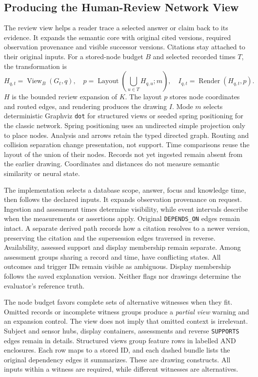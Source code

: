 \subsection{Producing the Human-Review Network View}
\label{sec:reviewview}

The review view helps a reader trace a selected answer or claim back to its
evidence. It expands the semantic core with original cited versions, required
observation provenance and visible successor versions. Citations stay attached
to their original inputs. For a stored-node budget $B$ and selected recorded
times $T$, the transformation is
\begin{equation}
 H_{q,t}=\operatorname{View}_B(G_t,q),\quad
 p=\operatorname{Layout}\!\left(\bigcup_{u\in T}H_{q,u};m\right),\quad
 I_{q,t}=\operatorname{Render}(H_{q,t},p).
\label{eq:reviewview}
\end{equation}
$H$ is the bounded review expansion of $K$. The layout $p$ stores node coordinates
and routed edges, and rendering produces the drawing $I$.
Mode $m$ selects deterministic Graphviz \texttt{dot} for structured views or
seeded spring positioning for the classic network. Spring positioning uses an
undirected simple projection only to place nodes. Analysis and arrows retain
the typed directed graph. Routing and collision separation change presentation,
not support. Time comparisons reuse the layout of the union of their nodes.
Records not yet ingested remain absent from the earlier drawing. Coordinates
and distances do not measure semantic similarity or neural state.

The implementation selects a database scope, answer, focus and knowledge time,
then follows the declared inputs. It expands observation provenance on request.
Ingestion and assessment times determine visibility, while event intervals
describe when the measurements or assertions apply.
Original \texttt{DEPENDS\_ON} edges remain intact. A separate derived path records
how a citation resolves to a newer version, preserving the citation and the
supersession edges traversed in reverse. Availability, assessed support and
display membership remain separate. Among \SemAssessmentTies{} assessment groups
sharing a record and time, \SemAssessmentConflicts{} have conflicting states.
All outcomes and trigger IDs remain visible as ambiguous. Display membership
follows the saved explanation version. Neither flags nor drawings determine
the evaluator's reference truth.

The node budget favors complete sets of alternative witnesses when they fit.
Omitted records or incomplete witness groups produce a \emph{partial view}
warning and an expansion control. The view does not imply that omitted context
is irrelevant. Subject and sensor hubs, display containers, assessments and
reverse \texttt{SUPPORTS} edges remain in details. Structured views group feature
rows in labelled AND enclosures. Each row maps to a stored ID, and each dashed
bundle lists the original dependency edges it summarizes. These are drawing
constructs. All inputs within a witness are required, while different witnesses
are alternatives.

